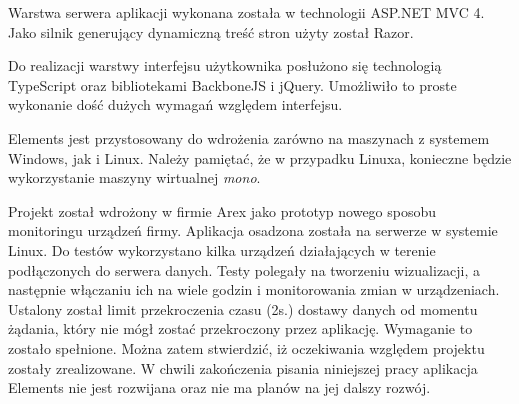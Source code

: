 Warstwa serwera aplikacji wykonana została w technologii ASP.NET MVC 4. Jako silnik generujący dynamiczną treść stron użyty został Razor. 

Do realizacji warstwy interfejsu użytkownika posłużono się technologią TypeScript oraz bibliotekami BackboneJS i jQuery. Umożliwiło to proste wykonanie dość dużych wymagań względem interfejsu.

Elements jest przystosowany do wdrożenia zarówno na maszynach z systemem Windows, jak i Linux. Należy pamiętać, że w przypadku Linuxa, konieczne będzie wykorzystanie maszyny wirtualnej \textit{mono}.

Projekt został wdrożony w firmie Arex jako prototyp nowego sposobu monitoringu urządzeń firmy. Aplikacja osadzona została na serwerze w systemie Linux. Do testów wykorzystano kilka urządzeń działających w terenie podłączonych do serwera danych. Testy polegały na tworzeniu wizualizacji, a następnie włączaniu ich na wiele godzin i monitorowania zmian w urządzeniach. Ustalony został limit przekroczenia czasu (2s.) dostawy danych od momentu żądania, który nie mógł zostać przekroczony przez aplikację. Wymaganie to zostało spełnione. Można zatem stwierdzić, iż oczekiwania względem projektu zostały zrealizowane. 
W chwili zakończenia pisania niniejszej pracy aplikacja Elements nie jest rozwijana oraz nie ma planów na jej dalszy rozwój.